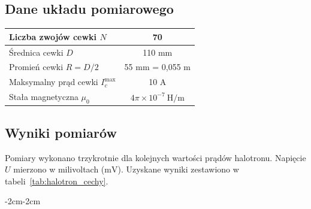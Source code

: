 \documentclass{fizykalab}
\begin{document}
\bigskip
\subsection{Dane układu pomiarowego}

\begin{center}
  \begin{tabular}{|l|c|}
    \hline
    Liczba zwojów cewki \(N\) & 70 \\
    \hline
    Średnica cewki \(D\) & 110 mm \\
    \hline
    Promień cewki \(R = D/2\) & 55 mm = 0{,}055 m \\
    \hline
    Maksymalny prąd cewki \(I_c^{\mathrm{max}}\) & 10 A \\
    \hline
    Stała magnetyczna \(\mu_0\) & \(4\pi\times10^{-7}\ \mathrm{H/m}\) \\
    \hline
  \end{tabular}
\end{center}

\bigskip
\subsection{Wyniki pomiarów}

Pomiary wykonano trzykrotnie dla kolejnych wartości prądów halotronu.
Napięcie \(U\) mierzono w milivoltach (\(\mathrm{mV}\)).
Uzyskane wyniki zestawiono w tabeli~\ref{tab:halotron_cechy}.

\begin{table}[H]
  \begin{adjustwidth}{-2cm}{-2cm}  %
    \centering
    \caption{Zależność napięcia Halla \(U\) od prądu cewki \(I_c\).}
    \label{tab:halotron_cechy}
  \end{adjustwidth}
\end{table}
\end{document}
